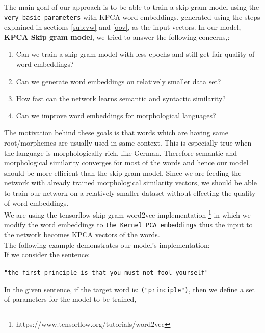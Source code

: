 The main goal of our approach is to be able to train a skip gram model using the \texttt{very basic parameters} with KPCA word embeddings, generated using the steps explained in sections \ref{sub:vw} and \ref{oov}, as the input vectors. In our model, \textbf{KPCA Skip gram model}, we tried to answer the following concerns,:
 \begin{enumerate}
 	\item Can we train a skip gram model with less epochs and still get fair quality of word embeddings?
 	\item Can we generate word embeddings on relatively smaller data set?
 	\item How fast can the network learns semantic and syntactic similarity?
 	\item Can we improve word embeddings for morphological languages?
 \end{enumerate} 
 The motivation behind these goals is that words which are having same root/morphemes are usually used in same context. This is especially true when the language is morphologically rich, like German. Therefore semantic and morphological similarity converges for most of the words and hence our model should be more efficient than the skip gram model. Since we are feeding the network with already trained morphological similarity vectors, we should be able to train our network on a relatively smaller dataset without effecting the quality of word embeddings.\\
 We are using the tensorflow skip gram word2vec implementation \footnote{https://www.tensorflow.org/tutorials/word2vec} in which we modify the word embeddings to \texttt{the Kernel PCA embeddings} thus the input to the network becomes KPCA vectors of the words.\\
 The following example demonstrates our model's implementation:\\
 If we consider the sentence:
 \begin{center}
 	\texttt{"the first principle is that you must not fool yourself"}
 \end{center}
 In the given sentence, if the target word is: \texttt{("principle")}, then we define a set of parameters for the model to be trained, 
